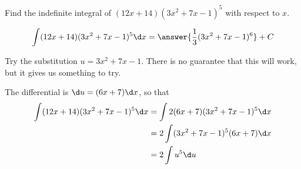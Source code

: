 \documentclass{ximera}
\author{Gregory Hartman \and Matthew Carr\and Nela Lakos \and Bobby Ramsey}
\begin{document}
\begin{exercise}


Find the indefinite integral of $(12 x+14)(3 x^2+7 x-1)^5$ with respect to $x$.

\[
\int (12 x+14)(3 x^2+7 x-1)^5 \d x=\answer{\frac{1}{3} (3x^2+7x-1)^6}+C
\]

\begin{hint}
	Try the substitution $u=3 x^2+7 x-1$. There is no guarantee that this will work, but it gives us something to try.
\end{hint}
\begin{hint}
	The differential is $\d u=(6 x+7)\d x $, so that  
	\begin{align*}
		\int (12 x+14)(3 x^2+7 x-1)^5 \d x &= \int 2(6 x+7)(3 x^2+7 x-1)^5 \d x\\
			&= 2 \int (3 x^2+7 x-1)^5  (6 x+7)\d x \\
			&= 2 \int u^5 \d u
	\end{align*}
\end{hint}

\end{exercise}
\end{document}
